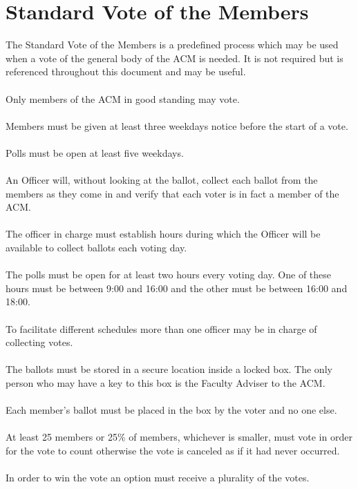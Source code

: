 \documentclass[12pt,titlepage]{article}
\begin{document}
\section{Standard Vote of the Members}

The Standard Vote of the Members is a predefined process which may be used when a vote of the general body of the ACM is needed. It is not required but is referenced throughout this document and may be useful.\\
\\
Only members of the ACM in good standing may vote.\\
\\
Members must be given at least three weekdays notice before the start of a vote.\\
\\
Polls must be open at least five weekdays.\\
\\
An Officer will, without looking at the ballot, collect each ballot from the members as they come in and verify that each voter is in fact a member of the ACM.\\
\\
The officer in charge must establish hours during which the Officer will be available to collect ballots each voting day.\\
\\
The polls must be open for at least two hours every voting day. One of these hours must be between 9:00 and 16:00 and the other must be between 16:00 and 18:00.\\
\\
To facilitate different schedules more than one officer may be in charge of collecting votes.\\
\\
The ballots must be stored in a secure location inside a locked box. The only person who may have a key to this box is the Faculty Adviser to the ACM.\\
\\
Each member's ballot must be placed in the box by the voter and no one else.\\
\\
At least 25 members or 25\% of members, whichever is smaller, must vote in order for the vote to count otherwise the vote is canceled as if it had never occurred.\\
\\
In order to win the vote an option must receive a plurality of the votes.
\end{document}

